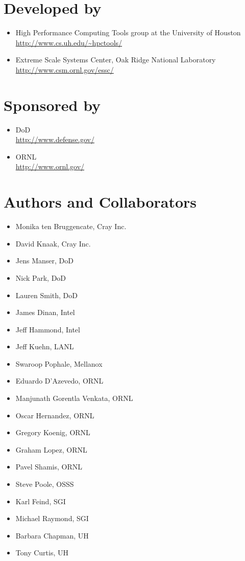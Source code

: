 \vfill{}

\section*{Developed by}
\begin{itemize}
\item High Performance Computing Tools group at the University of Houston\\
  \url{http://www.cs.uh.edu/~hpctools/} 
\item Extreme Scale Systems Center, Oak Ridge National Laboratory\\
  \url{http://www.csm.ornl.gov/essc/} 
\end{itemize}
\pagebreak{}

\section*{Sponsored by}
\begin{itemize}
\item \ac{DoD}\\
  \url{http://www.defense.gov/ }
\item \ac{ORNL}\\
  \url{http://www.ornl.gov/} 
\end{itemize}

\section*{Authors and Collaborators}
\begin{itemize}
\item Monika ten Bruggencate, Cray Inc.
\item David Knaak, Cray Inc.
\item Jens Manser, \ac{DoD}
\item Nick Park, \ac{DoD}
\item Lauren Smith, \ac{DoD}
\item James Dinan, Intel
\item Jeff Hammond, Intel
\item Jeff Kuehn, \ac{LANL}
\item Swaroop Pophale, Mellanox
\item Eduardo D'Azevedo, \ac{ORNL}
\item Manjunath Gorentla Venkata, \ac{ORNL}
\item Oscar Hernandez, \ac{ORNL}
\item Gregory Koenig, \ac{ORNL}
\item Graham Lopez, \ac{ORNL}
\item Pavel Shamis, \ac{ORNL}
\item Steve Poole, OSSS
\item Karl Feind, SGI
\item Michael Raymond, SGI
\item Barbara Chapman, \ac{UH} 
\item Tony Curtis, \ac{UH}
\end{itemize}

